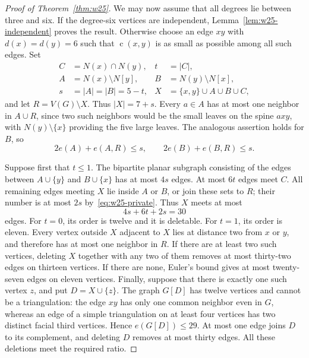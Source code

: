 \documentclass[11pt,a4paper]{article}
\theoremstyle{remark}
\newcommand{\cdeg}{\operatorname{c}}
\begin{document}
\begin{proof}[Proof of Theorem~\ref{thm:w25}]
We may now assume that all degrees lie between three and six. If the degree-six vertices are independent, Lemma~\ref{lem:w25-independent} proves the result. Otherwise choose an edge $xy$ with $d(x)=d(y)=6$ such that $\cdeg(x,y)$ is as small as possible among all such edges. Set
\begin{align*}
C&=N(x)\cap N(y), &t&=|C|,\\
A&=N(x)\setminus N[y], &B&=N(y)\setminus N[x],\\
s&=|A|=|B|=5-t, &X&=\{x,y\}\cup A\cup B\cup C,
\end{align*}
and let $R=V(G)\setminus X$. Thus $|X|=7+s$. Every $a\in A$ has at most one neighbor in $A\cup R$, since two such neighbors would be the small leaves on the spine $axy$, with $N(y)\setminus\{x\}$ providing the five large leaves. The analogous assertion holds for $B$, so
\begin{equation}\label{eq:w25-private}
2e(A)+e(A,R)\le s,\qquad 2e(B)+e(B,R)\le s.
\end{equation}

Suppose first that $t\le1$. The bipartite planar subgraph consisting of the edges between $A\cup\{y\}$ and $B\cup\{x\}$ has at most $4s$ edges. At most $6t$ edges meet $C$. All remaining edges meeting $X$ lie inside $A$ or $B$, or join these sets to $R$; their number is at most $2s$ by~\eqref{eq:w25-private}. Thus $X$ meets at most
\[
4s+6t+2s=30
\]
edges. For $t=0$, its order is twelve and it is deletable. For $t=1$, its order is eleven. Every vertex outside $X$ adjacent to $X$ lies at distance two from $x$ or $y$, and therefore has at most one neighbor in $R$. If there are at least two such vertices, deleting $X$ together with any two of them removes at most thirty-two edges on thirteen vertices. If there are none, Euler's bound gives at most twenty-seven edges on eleven vertices. Finally, suppose that there is exactly one such vertex $z$, and put $D=X\cup\{z\}$. The graph $G[D]$ has twelve vertices and cannot be a triangulation: the edge $xy$ has only one common neighbor even in $G$, whereas an edge of a simple triangulation on at least four vertices has two distinct facial third vertices. Hence $e(G[D])\le29$. At most one edge joins $D$ to its complement, and deleting $D$ removes at most thirty edges. All these deletions meet the required ratio.


\end{proof}
\end{document}

